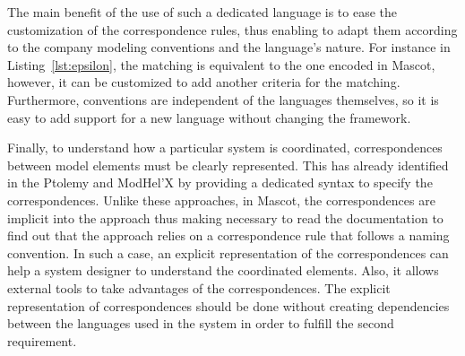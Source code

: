 {The main benefit of the use of such a dedicated language is to ease the customization of the correspondence rules, thus enabling to adapt them according to the company modeling conventions and the language's nature. For instance in Listing~\ref{lst:epsilon}, the matching is equivalent to the one encoded in Mascot, however, it can be customized to add another criteria for the matching. Furthermore, conventions are independent of the languages themselves, so it is easy to add support for a new language without changing the framework.


Finally, to understand how a particular system is coordinated, correspondences between model elements must be clearly represented. This has already identified in the Ptolemy and ModHel'X by providing a dedicated syntax to specify the correspondences. Unlike these approaches, in Mascot, the correspondences are implicit into the approach thus making necessary to read the documentation to find out that the approach relies on a correspondence rule that follows a naming convention. In such a case, an explicit representation of the correspondences can help a system designer to understand the coordinated elements. Also, it allows external tools to take advantages of the correspondences. The explicit representation of correspondences should be done without creating dependencies between the languages used in the system in order to fulfill the second requirement.%
	
	
	
	
	
}

